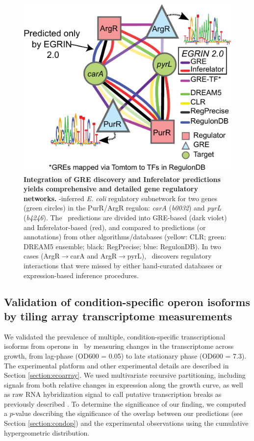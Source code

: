 \begin{figure}[hp]
\centering
\includegraphics[width=0.75\linewidth]{figures/argR_purR_networks.pdf}
\caption[Integration of GRE discovery and Inferelator predictions
  yields comprehensive and detailed gene regulatory
  networks]{\textbf{Integration of GRE discovery and Inferelator
    predictions yields comprehensive and detailed gene regulatory
    networks.} \egrine-inferred \textit{E. coli} regulatory subnetwork
  for two genes (green circles) in the PurR/ArgR regulon:
  \textit{carA} (\textit{b0032}) and \textit{pyrL} (\textit{b4246}).
  The \egrine~predictions are divided into GRE-based (dark violet) and
  Inferelator-based (red), and compared to predictions (or
  annotations) from other algorithms/databases (yellow: CLR; green:
  DREAM5 ensemble; black: RegPrecise; blue: RegulonDB). In two cases
  (ArgR$\rightarrow$carA and ArgR$\rightarrow$pyrL), \egrine~discovers
  regulatory interactions that were missed by either hand-curated
  databases or expression-based inference procedures.}
\label{fig:argR_purR_networks}
\end{figure} 

\subsection{Validation of condition-specific operon isoforms by tiling array transcriptome measurements}

We validated the prevalence of multiple, condition-specific
transcriptional isoforms from operons in \eco\ by measuring changes in
the transcriptome across growth, from lag-phase (OD600 = 0.05) to late
stationary phase (OD600 = 7.3). The experimental platform and other
experimental details are described in Section
\ref{section:ecoarray}. We used multivariate recursive partitioning,
including signals from both relative changes in expression along the
growth curve, as well as raw RNA hybridization signal to call putative
transcription breaks as previously described \cite{Koide2009}. To
determine the significance of our finding, we computed a $p$-value
describing the significance of the overlap between our predictions
(see Section \ref{section:condop}) and the experimental observations
using the cumulative hypergeometric distribution.

